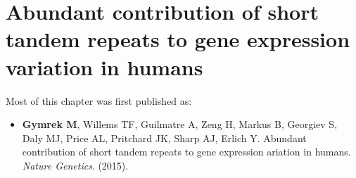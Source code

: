 \chapter{Abundant contribution of short tandem repeats to gene expression variation in humans}

\hzline

Most of this chapter was first published as:

\begin{itemize}
\item[] \textbf{Gymrek M}, Willems TF, Guilmatre A, Zeng H, Markus B, Georgiev S, Daly MJ, Price AL, Pritchard JK, Sharp AJ, Erlich Y. Abundant contribution of short tandem repeats to gene expression ariation in humans. \emph{Nature Genetics}. (2015).
\end{itemize}

\hzline

